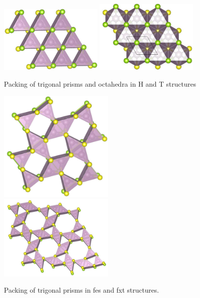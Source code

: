 \documentclass[a4paperm]{article}
\begin{document}
\begin{figure}[H]
        \includegraphics[width=0.45\textwidth]{1H.jpg}
        \includegraphics[width=0.45\textwidth]{1T.jpg}
        \caption{Packing of trigonal prisms and octahedra in H and T structures}
\label{1H1T}
\label{fes_fxt}
\end{figure}

\begin{figure}[H] \centering
	\includegraphics[width=0.5\textwidth]{fes_SMoSe.jpg}
        \includegraphics[width=0.5\textwidth]{fxt_SMoSe.jpg}
	\caption{Packing of trigonal prisms in fes and fxt structures.}
\label{fes_fxt}
\end{figure}
\end{document}
